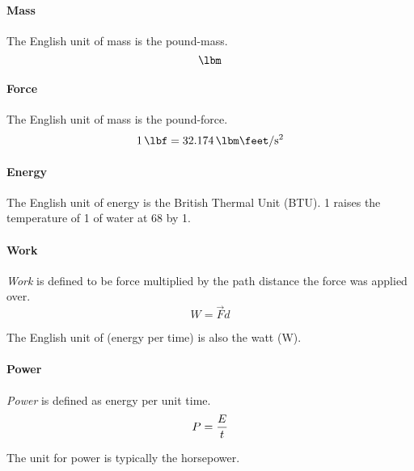 \paragraph{Mass}\label{par:English_Mass}
The English unit of mass is the pound-mass.
\begin{equation*}
  \si{\lbm}
\end{equation*}

\paragraph{Force}\label{par:English_Force}
The English unit of mass is the pound-force.
\begin{equation*}
  \SI{1}{\lbf} = \SI[per-mode=symbol]{32.174}{\lbm\feet\per\second\squared}
\end{equation*}

\paragraph{Energy}\label{par:English_Energy}
The English unit of energy is the British Thermal Unit (BTU).
\SI{1}{\btu} raises the temperature of \SI{1}{\lbm} of water at \SI{68}{\degreeF} by \SI{1}{\degreeF}.

\paragraph{Work}\label{par:English_Work}
\begin{definition}[Work]\label{def:Work}
  \emph{Work} is defined to be force multiplied by the path distance the force was applied over.
  \begin{equation}\label{eq:Work}
    W = \vec{F} d
  \end{equation}
\end{definition}

The English unit of  (energy per time) is also the watt (\si{\watt}).

\paragraph{Power}\label{par:English_Power}
\begin{definition}[Power]\label{def:Power}
  \emph{Power} is defined as energy per unit time.
  \begin{equation}\label{eq:Power}
    P = \frac{E}{t}
  \end{equation}
\end{definition}

The unit for power is typically the horsepower.

